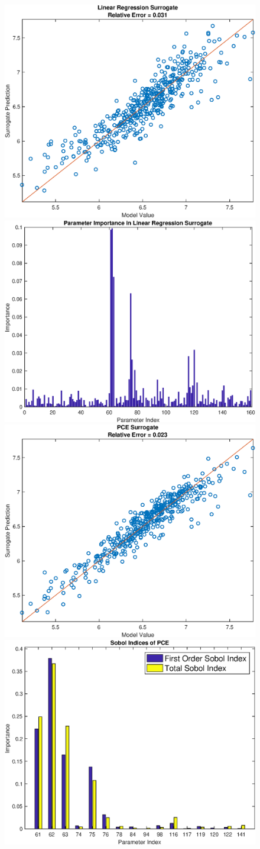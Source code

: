 \documentclass[12pt]{article}
\numberwithin{equation}{section}
\begin{document}
\begin{figure}[h]
\centering
\includegraphics[width=.49 \textwidth]{Figures/K_ECS_Mean_QoI_LR_Prediction_Experimental.eps}
\includegraphics[width=.49 \textwidth]{Figures/K_ECS_Mean_QoI_LR_VI_Experimental.eps}\\
\includegraphics[width=.49 \textwidth]{Figures/K_ECS_Mean_QoI_PCE_Prediction_Experimental.eps}
\includegraphics[width=.49 \textwidth]{Figures/K_ECS_Mean_QoI_PCE_SI_Experimental.eps}
\end{figure}
\end{document}
